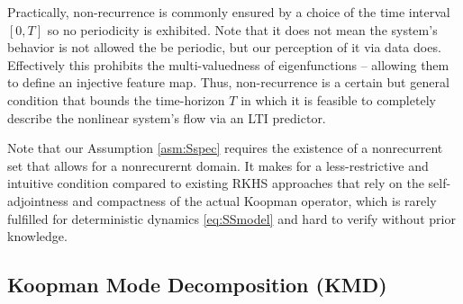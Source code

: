 Practically, non-recurrence is commonly ensured by a choice of the time interval $[0,T]$ so no periodicity is exhibited. Note that it does not mean the system's behavior is not allowed the be periodic, but our perception of it via data does. Effectively this prohibits the multi-valuedness of eigenfunctions -- allowing them to define an injective feature map.
    Thus, non-recurrence is a certain but general condition that bounds the time-horizon $T$ in which it is feasible to completely describe the nonlinear system's flow via an LTI predictor.
    
Note that our Assumption \ref{asm:Sspec} requires the existence of a nonrecurrent set that allows for a nonrecurernt domain.
It makes for a less-restrictive and intuitive condition compared to existing RKHS approaches \citep{Kostic2022LearningSpaces,Kostic2023KoopmanEigenvalues} that rely on the self-adjointness and compactness of the actual Koopman operator, which is rarely fulfilled for deterministic dynamics \eqref{eq:SSmodel} and hard to verify without prior knowledge.

\subsection{Koopman Mode Decomposition (KMD)}

